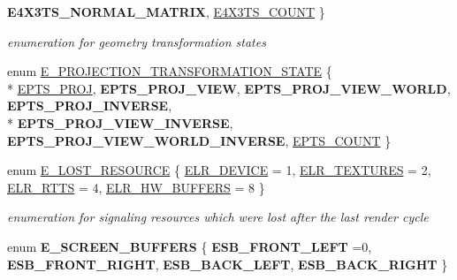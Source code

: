 \begin{DoxyCompactItemize}
{\bfseries E4\+X3\+T\+S\+\_\+\+N\+O\+R\+M\+A\+L\+\_\+\+M\+A\+T\+R\+IX}, 
\hyperlink{namespaceirr_1_1video_a9f34b0dd7b888c8cbabb22989f23b853a3693b5c4f69b7f6ff332892f48d86651}{E4\+X3\+T\+S\+\_\+\+C\+O\+U\+NT}
 \}\begin{DoxyCompactList}\small\item\em enumeration for geometry transformation states \end{DoxyCompactList}
\item 
enum \hyperlink{namespaceirr_1_1video_a1336265bc542e3a3855f420565d889b6}{E\+\_\+\+P\+R\+O\+J\+E\+C\+T\+I\+O\+N\+\_\+\+T\+R\+A\+N\+S\+F\+O\+R\+M\+A\+T\+I\+O\+N\+\_\+\+S\+T\+A\+TE} \{ \\*
\hyperlink{namespaceirr_1_1video_a1336265bc542e3a3855f420565d889b6ae75f6a1cf441e3671a1c13be09972f1d}{E\+P\+T\+S\+\_\+\+P\+R\+OJ}, 
{\bfseries E\+P\+T\+S\+\_\+\+P\+R\+O\+J\+\_\+\+V\+I\+EW}, 
{\bfseries E\+P\+T\+S\+\_\+\+P\+R\+O\+J\+\_\+\+V\+I\+E\+W\+\_\+\+W\+O\+R\+LD}, 
{\bfseries E\+P\+T\+S\+\_\+\+P\+R\+O\+J\+\_\+\+I\+N\+V\+E\+R\+SE}, 
\\*
{\bfseries E\+P\+T\+S\+\_\+\+P\+R\+O\+J\+\_\+\+V\+I\+E\+W\+\_\+\+I\+N\+V\+E\+R\+SE}, 
{\bfseries E\+P\+T\+S\+\_\+\+P\+R\+O\+J\+\_\+\+V\+I\+E\+W\+\_\+\+W\+O\+R\+L\+D\+\_\+\+I\+N\+V\+E\+R\+SE}, 
\hyperlink{namespaceirr_1_1video_a1336265bc542e3a3855f420565d889b6af8d381c55dbad2f5e7bc58327b63a897}{E\+P\+T\+S\+\_\+\+C\+O\+U\+NT}
 \}
\item 
enum \hyperlink{namespaceirr_1_1video_a5b423450f4c1775bfdc86b5998c3db72}{E\+\_\+\+L\+O\+S\+T\+\_\+\+R\+E\+S\+O\+U\+R\+CE} \{ \hyperlink{namespaceirr_1_1video_a5b423450f4c1775bfdc86b5998c3db72adac2eae358f00a2b6b8d5da56bc6d150}{E\+L\+R\+\_\+\+D\+E\+V\+I\+CE} = 1, 
\hyperlink{namespaceirr_1_1video_a5b423450f4c1775bfdc86b5998c3db72a23b58f43419e5a990655f0ee331497a7}{E\+L\+R\+\_\+\+T\+E\+X\+T\+U\+R\+ES} = 2, 
\hyperlink{namespaceirr_1_1video_a5b423450f4c1775bfdc86b5998c3db72aeb70fa0500307facb6ebfd368aaa1f5e}{E\+L\+R\+\_\+\+R\+T\+TS} = 4, 
\hyperlink{namespaceirr_1_1video_a5b423450f4c1775bfdc86b5998c3db72aababdf6d3357bb40f416cd76d25c7bcc}{E\+L\+R\+\_\+\+H\+W\+\_\+\+B\+U\+F\+F\+E\+RS} = 8
 \}\begin{DoxyCompactList}\small\item\em enumeration for signaling resources which were lost after the last render cycle \end{DoxyCompactList}
\item 
enum {\bfseries E\+\_\+\+S\+C\+R\+E\+E\+N\+\_\+\+B\+U\+F\+F\+E\+RS} \{ {\bfseries E\+S\+B\+\_\+\+F\+R\+O\+N\+T\+\_\+\+L\+E\+FT} =0, 
{\bfseries E\+S\+B\+\_\+\+F\+R\+O\+N\+T\+\_\+\+R\+I\+G\+HT}, 
{\bfseries E\+S\+B\+\_\+\+B\+A\+C\+K\+\_\+\+L\+E\+FT}, 
{\bfseries E\+S\+B\+\_\+\+B\+A\+C\+K\+\_\+\+R\+I\+G\+HT}
 \}\hypertarget{namespaceirr_1_1video_a52eee468462fa22f4eaa9dc30b3c529b}{}\label{namespaceirr_1_1video_a52eee468462fa22f4eaa9dc30b3c529b}


\end{DoxyCompactItemize}
